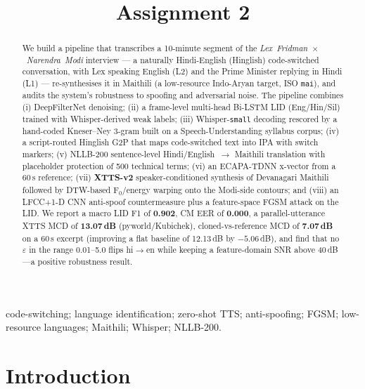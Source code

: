 \documentclass[conference]{IEEEtran}
\title{Assignment 2}
\author{
  \IEEEauthorblockN{Tejas Gupta}
  \IEEEauthorblockA{B22CS093\\
  Indian Institute of Technology, Jodhpur\\
 }
}
\begin{document}
\maketitle

\begin{abstract}
We build a pipeline that transcribes a 10-minute segment of the
\emph{Lex~Fridman~$\times$~Narendra~Modi} interview --- a naturally
Hindi-English (Hinglish) code-switched conversation, with Lex speaking
English (L2) and the Prime Minister replying in Hindi (L1) --- re-synthesises
it in Maithili (a low-resource Indo-Aryan target, ISO \texttt{mai}), and
audits the system's robustness to spoofing and adversarial noise. The pipeline combines (i) DeepFilterNet
denoising; (ii) a frame-level multi-head Bi-LSTM LID (Eng/Hin/Sil) trained
with Whisper-derived weak labels; (iii) Whisper-\texttt{small} decoding
rescored by a hand-coded Kneser--Ney 3-gram built on a Speech-Understanding
syllabus corpus; (iv) a script-routed Hinglish G2P that maps code-switched
text into IPA with switch markers; (v) NLLB-200 sentence-level
Hindi/English~$\rightarrow$ Maithili translation with placeholder protection
of 500 technical terms; (vi) an ECAPA-TDNN x-vector from a 60\,s reference;
(vii) \textbf{XTTS-v2} speaker-conditioned synthesis of Devanagari Maithili
followed by DTW-based \mbox{F$_{0}$}/energy warping onto the Modi-side
contours; and (viii) an LFCC+1-D CNN anti-spoof countermeasure plus a
feature-space FGSM attack on the LID. We report a macro LID F1 of
\textbf{0.902}, CM EER of \textbf{0.000}, a parallel-utterance XTTS MCD of
\textbf{13.07\,dB} (pyworld/Kubichek), cloned-vs-reference MCD of
\textbf{7.07\,dB} on a 60\,s excerpt (improving a flat baseline of
12.13\,dB by $-5.06$\,dB), and find that no $\varepsilon$ in the
range 0.01--5.0 flips hi$\to$en while keeping a feature-domain SNR above
40\,dB---a positive robustness result.
\end{abstract}

\begin{IEEEkeywords}
code-switching; language identification; zero-shot TTS; anti-spoofing; FGSM;
low-resource languages; Maithili; Whisper; NLLB-200.
\end{IEEEkeywords}

\section{Introduction}
\end{document}

